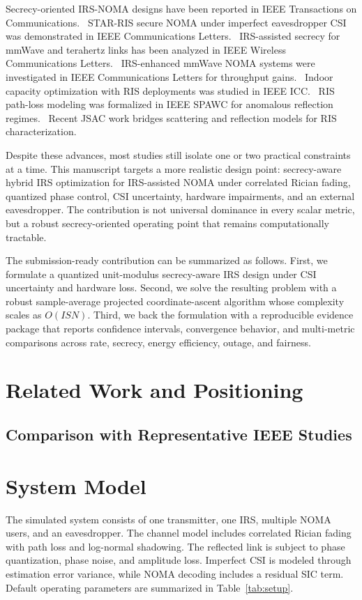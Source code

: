 \documentclass[journal]{IEEEtran}
\begin{document}
Secrecy-oriented IRS-NOMA designs have been reported in IEEE Transactions on Communications.~\cite{zhang2022_tcom}
STAR-RIS secure NOMA under imperfect eavesdropper CSI was demonstrated in IEEE Communications Letters.~\cite{jia2023_lcomm}
IRS-assisted secrecy for mmWave and terahertz links has been analyzed in IEEE Wireless Communications Letters.~\cite{qiao2020_wcl}
IRS-enhanced mmWave NOMA systems were investigated in IEEE Communications Letters for throughput gains.~\cite{zuo2020_wcl}
Indoor capacity optimization with RIS deployments was studied in IEEE ICC.~\cite{perovic2020_icc}
RIS path-loss modeling was formalized in IEEE SPAWC for anomalous reflection regimes.~\cite{direnzo2020_spawc}
Recent JSAC work bridges scattering and reflection models for RIS characterization.~\cite{garcia2020_jsac}

Despite these advances, most studies still isolate one or two practical constraints at a time. This manuscript targets a more realistic design point: secrecy-aware hybrid IRS optimization for IRS-assisted NOMA under correlated Rician fading, quantized phase control, CSI uncertainty, hardware impairments, and an external eavesdropper. The contribution is not universal dominance in every scalar metric, but a robust secrecy-oriented operating point that remains computationally tractable.

The submission-ready contribution can be summarized as follows. First, we formulate a quantized unit-modulus secrecy-aware IRS design under CSI uncertainty and hardware loss. Second, we solve the resulting problem with a robust sample-average projected coordinate-ascent algorithm whose complexity scales as $O(ISN)$. Third, we back the formulation with a reproducible evidence package that reports confidence intervals, convergence behavior, and multi-metric comparisons across rate, secrecy, energy efficiency, outage, and fairness.

\section{Related Work and Positioning}


\subsection{Comparison with Representative IEEE Studies}


\section{System Model}
The simulated system consists of one transmitter, one IRS, multiple NOMA users, and an eavesdropper. The channel model includes correlated Rician fading with path loss and log-normal shadowing. The reflected link is subject to phase quantization, phase noise, and amplitude loss. Imperfect CSI is modeled through estimation error variance, while NOMA decoding includes a residual SIC term. Default operating parameters are summarized in Table~\ref{tab:setup}.
\end{document}
